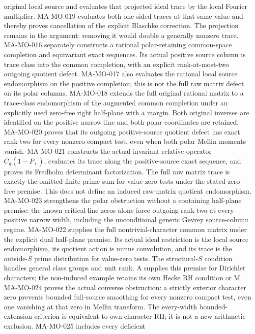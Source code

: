 \documentclass[11pt,a4paper]{article}
\begin{document}
original local source and evaluates that projected ideal
trace by the local Fourier multiplier. MA-MO-019 evaluates both
one-sided traces at that same value and thereby proves cancellation
of the explicit Blaschke correction. The projection remains in the
argument: removing it would double a generally nonzero trace.
MA-MO-016 separately constructs a rational
polar-retaining common-space completion and equivariant exact
sequences. Its actual positive source column is trace class
into the common completion, with an explicit rank-at-most-two
outgoing quotient defect. MA-MO-017 also evaluates the rational
local source endomorphism on the positive completion; this
is not the full raw matrix defect on its polar columns.
MA-MO-018 extends the full original rational matrix to a trace-class
endomorphism of the augmented common completion under an explicitly
used zero-free right half-plane with a margin. Both original
inverses are identified on the positive narrow line and both polar
coordinates are retained. MA-MO-020 proves that its outgoing
positive-source quotient defect has exact rank two for every
nonzero compact test, even when both polar Mellin moments vanish.
MA-MO-021 constructs the actual invariant relative operator
\(C_g(1-P_+)\), evaluates its trace along the positive-source
exact sequence, and proves its Fredholm determinant factorization.
The full raw matrix trace is exactly the omitted finite-prime
sum for value-zero tests under the stated zero-free premise.
This does not define an induced raw-matrix quotient endomorphism.
MA-MO-023 strengthens the polar obstruction without a containing
half-plane premise: the known critical-line zeros alone force
outgoing rank two at every positive narrow width, including
the unconditional generic Gevrey source-column regime.
MA-MO-022 supplies the full nontrivial-character common matrix
under the explicit dual half-plane premise. Its actual ideal
restriction is the local source endomorphism, its quotient
action is minus convolution, and its trace is the outside-$S$
prime distribution for value-zero tests. The structural-$S$
condition handles general class groups and unit rank. A supplies
this premise for Dirichlet characters; the non-induced example
retains its own Hecke RH condition or M.
MA-MO-024 proves the actual converse obstruction: a strictly
exterior character zero prevents bounded full-source smoothing
for every nonzero compact test, even one vanishing at that
zero in Mellin transform. The every-width bounded-extension
criterion is equivalent to own-character RH; it is not a new
arithmetic exclusion. MA-MO-025 includes every deficient
\end{document}

